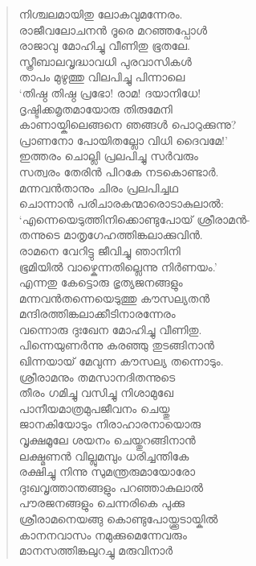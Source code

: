 \begin{verse}
നിശ്ചലമായിതു ലോകവുമന്നേരം.\\
രാജീവലോചനന്‍ ദൂരെ മറഞ്ഞപ്പോള്‍\\
രാജാവു മോഹിച്ചു വീണിതു ഭൂതലേ.\\
സ്ത്രീബാലവൃദ്ധാവധി പുരവാസികള്‍\\
താപം മുഴുത്തു വിലപിച്ചു പിന്നാലെ\\
‘തിഷ്ഠ തിഷ്ഠ പ്രഭോ! രാമ! ദയാനിധേ!\\
ദൃഷ്ടിക്കമൃതമായോരു തിരുമേനി\\
കാണായ്കിലെങ്ങനെ ഞങ്ങള്‍ പൊറുക്കുന്നു?\\
പ്രാണനോ പോയിതല്ലോ വിധി ദൈവമേ!’\\
ഇത്തരം ചൊല്ലി പ്രലപിച്ചു സര്‍വരും\\
സത്വരം തേരിന്‍ പിറകേ നടകൊണ്ടാര്‍.\\
മന്നവന്‍താനും ചിരം പ്രലപിച്ചഥ\\
ചൊന്നാന്‍ പരിചാരകന്മാരൊടാകുലാല്‍:\\
‘എന്നെയെടുത്തിനിക്കൊണ്ടുപോയ് ശ്രീരാമന്‍-\\
തന്നുടെ മാതൃഗേഹത്തിങ്കലാക്കുവിന്‍.\\
രാമനെ വേറിട്ടു ജീവിച്ചു ഞാനിനി\\
ഭൂമിയില്‍ വാഴ്കെന്നതില്ലെന്നു നിര്‍ണയം.’\\
എന്നതു കേട്ടൊരു ഭൃത്യജനങ്ങളും\\
മന്നവന്‍തന്നെയെടുത്തു കൗസല്യതന്‍\\
മന്ദിരത്തിങ്കലാക്കീടിനാരന്നേരം\\
വന്നൊരു ദുഃഖേന മോഹിച്ചു വീണിതു.\\
പിന്നെയുണര്‍ന്നു കരഞ്ഞു തുടങ്ങിനാന്‍\\
ഖിന്നയായ് മേവുന്ന കൗസല്യ തന്നൊടും.\\
ശ്രീരാമനും തമസാനദിതന്നുടെ\\
തീരം ഗമിച്ചു വസിച്ചു നിശാമുഖേ\\
പാനീയമാത്രമുപജീവനം ചെയ്തു\\
ജാനകിയോടും നിരാഹാരനായൊരു\\
വൃക്ഷമൂലേ ശയനം ചെയ്തുറങ്ങിനാന്‍\\
ലക്ഷ്മണന്‍ വില്ലുമമ്പും ധരിച്ചന്തികേ\\
രക്ഷിച്ചു നിന്നു സുമന്ത്രരുമായോരോ\\
ദുഃഖവൃത്താന്തങ്ങളും പറഞ്ഞാകുലാല്‍\\
പൗരജനങ്ങളും ചെന്നരികെ പുക്കു\\
ശ്രീരാമനെയങ്ങു കൊണ്ടുപോയ്ക്കൂടായ്കില്‍\\
കാനനവാസം നമുക്കുമെന്നേവരും\\
മാനസത്തിങ്കലുറച്ചു മരുവിനാര്‍\\

\end{verse}
